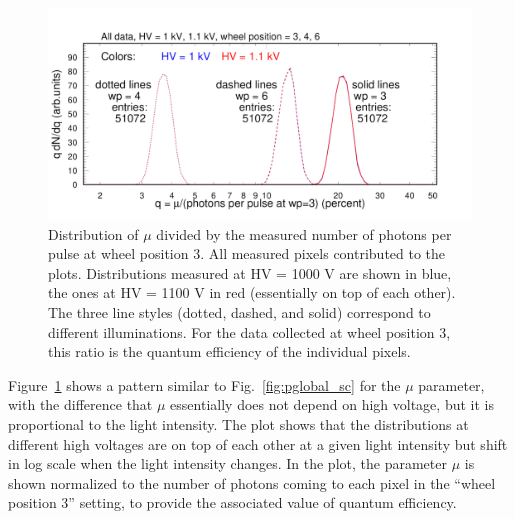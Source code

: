 \begin{figure}[h!]
	\centering
	\includegraphics[width=0.98\linewidth,trim=0 12 50 35,clip]{figures/pglobal_qe_all.pdf}
	\caption{Distribution of $\mu$ divided by the measured number of photons per pulse at wheel position 3. All measured pixels contributed to the plots. Distributions measured at HV = 1000 V are shown in blue, the ones at HV = 1100 V in red (essentially on top of each other). The three line styles (dotted, dashed, and solid) correspond to different illuminations. For the data collected at wheel position 3, this ratio is the quantum efficiency of the individual pixels.}
	\label{fig:pglobal_qe_all}
\end{figure}
Figure~\ref{fig:pglobal_qe_all} shows a pattern similar to Fig.~\ref{fig:pglobal_sc} for the $\mu$ parameter, with the difference that $\mu$ essentially does not depend on high voltage, but it is proportional to the light intensity. The plot shows that the distributions at different high voltages are on top of each other at a given light intensity but shift in log scale when the light intensity changes. In the plot, the parameter $\mu$ is shown normalized to the number of photons coming to each pixel in the ``wheel position 3'' setting, to provide the associated value of quantum efficiency. 

